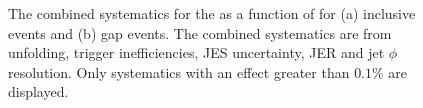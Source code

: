 \begin{figure}
\begin{subfigure}[b]{0.5\textwidth}
        \end{subfigure}%
\caption[Combined systematics for \mean{\costwodphi{}}]{
The combined systematics for the \mean{\costwodphi{}} as a function of \dy{}  for (a) inclusive events and (b) gap events.
The combined systematics are from unfolding, trigger inefficiencies, JES uncertainty, JER and jet $\phi$ resolution.
Only systematics with an effect greater than $0.1\%$ are displayed.
\label{GBJ2:SysComb:cos2}}
\end{figure}

